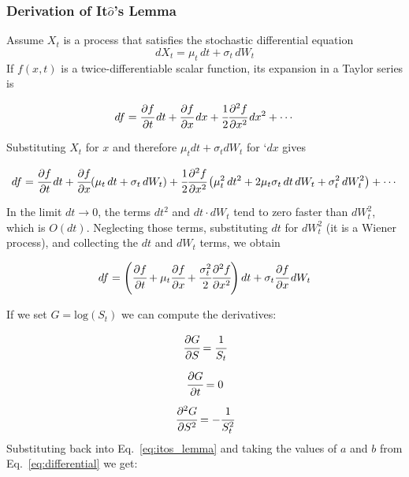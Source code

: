 \begin{attention}
\subsubsection{Derivation of It$\hat{o}$'s Lemma}
Assume $X_t$ is a process that satisfies the stochastic differential equation
\begin{equation*}	
dX_{t}=\mu_{t}\,dt+\sigma_{t}\,dW_{t}
\end{equation*}
If $f(x, t)$ is a twice-differentiable scalar function, its expansion in a Taylor series is
	
\begin{equation*}
df={\cfrac {\partial f}{\partial t}}\,dt+{\cfrac {\partial f}{\partial x}}\,dx+{\cfrac {1}{2}}{\cfrac {\partial ^{2}f}{\partial x^{2}}}\,dx^{2}+\cdots 
\end{equation*}

Substituting $X_t$ for $x$ and therefore $\mu_t dt + \sigma_t dW_t$ for `$dx$ gives
	
\begin{equation*}
df={\cfrac {\partial f}{\partial t}}\,dt+{\cfrac {\partial f}{\partial x}}(\mu _{t}\,dt+\sigma _{t}\,dW_{t})+{\cfrac {1}{2}}{\cfrac {\partial ^{2}f}{\partial x^{2}}}\left(\mu _{t}^{2}\,dt^{2}+2\mu _{t}\sigma _{t}\,dt\,dW_{t}+\sigma _{t}^{2}\,dW_{t}^{2}\right)+\cdots 
\end{equation*}

In the limit $dt\rightarrow 0$, the terms $dt^2$ and $dt\cdot dW_t$ tend to zero faster than $dW_t^2$, which is $O(dt)$. Neglecting those terms, substituting $dt$ for $dW_t^2$ (it is a Wiener process), and collecting the $dt$ and $dW_t$ terms, we obtain
	
\begin{equation*}
df=\left({\cfrac {\partial f}{\partial t}}+\mu _{t}{\cfrac {\partial f}{\partial x}}+{\cfrac {\sigma _{t}^{2}}{2}}{\cfrac {\partial ^{2}f}{\partial x^{2}}}\right)dt+\sigma _{t}{\cfrac {\partial f}{\partial x}}\,dW_{t}
\end{equation*}
\end{attention}

If we set $G = \textrm{log}(S_t)$ we can compute the derivatives:

\begin{equation}
\begin{gathered}
\cfrac{\partial G}{\partial S} = \cfrac{1}{S_t}\\[5pt]
\cfrac{\partial G}{\partial t} = 0\\[5pt]
\cfrac{\partial^2 G}{\partial S^2} = -\cfrac{1}{S_t^{2}}
\end{gathered}
\end{equation}
Substituting back into Eq.~\ref{eq:itos_lemma} and taking the values of $a$ and $b$ from Eq.~\ref{eq:differential} we get:

